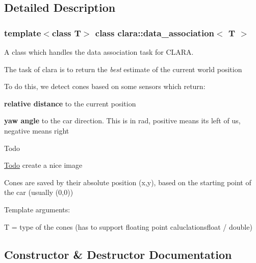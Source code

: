 \subsection{Detailed Description}
\subsubsection*{template$<$class T$>$\newline
class clara\+::data\+\_\+association$<$ T $>$}

A class which handles the data association task for C\+L\+A\+RA. 

The task of clara is to return the {\itshape best} estimate of the current world position

To do this, we detect cones based on some sensors which return\+:
\begin{DoxyItemize}
\item {\bfseries relative distance} to the current position
\item {\bfseries yaw angle} to the car direction. This is in rad, positive means it\textquotesingle{}s left of us, negative means right\begin{DoxyRefDesc}{Todo}
\item[\hyperlink{todo__todo000010}{Todo}]create a nice image\end{DoxyRefDesc}

\end{DoxyItemize}

Cones are saved by their absolute position (x,y), based on the starting point of the car (usually {\ttfamily (0,0)})

Template arguments\+:
\begin{DoxyItemize}
\item {\ttfamily T} = type of the cones (has to support floating point caluclationsfloat / double) 
\end{DoxyItemize}

\subsection{Constructor \& Destructor Documentation}
\mbox{\label{classclara_1_1data__association_aea67f1fd9ae7d96f7dd502774fc45828}} 
